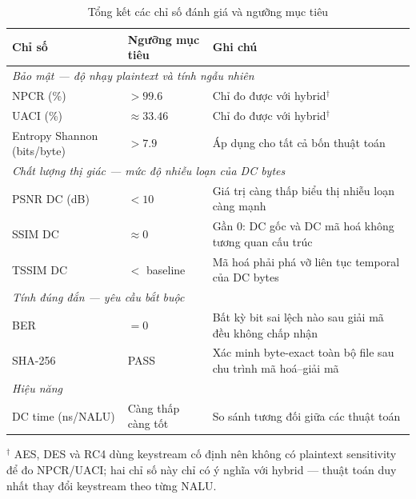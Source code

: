 \begin{table}[ht]
\centering
\caption{Tổng kết các chỉ số đánh giá và ngưỡng mục tiêu}
\label{tab:metrics_summary}
\begin{tabular}{|l|l|l|}
\hline
\textbf{Chỉ số} & \textbf{Ngưỡng mục tiêu} & \textbf{Ghi chú} \\
\hline
\multicolumn{3}{|l|}{\textit{Bảo mật --- độ nhạy plaintext và tính ngẫu nhiên}} \\
\hline
NPCR (\%) & $> 99.6$ & Chỉ đo được với hybrid$^\dagger$ \\
UACI (\%) & $\approx 33.46$ & Chỉ đo được với hybrid$^\dagger$ \\
Entropy Shannon (bits/byte) & $> 7.9$ & Áp dụng cho tất cả bốn thuật toán \\
\hline
\multicolumn{3}{|l|}{\textit{Chất lượng thị giác --- mức độ nhiễu loạn của DC bytes}} \\
\hline
PSNR DC (dB) & $< 10$ & Giá trị càng thấp biểu thị nhiễu loạn càng mạnh \\
SSIM DC & $\approx 0$ & Gần 0: DC gốc và DC mã hoá không tương quan cấu trúc \\
TSSIM DC & $<$ baseline & Mã hoá phải phá vỡ liên tục temporal của DC bytes \\
\hline
\multicolumn{3}{|l|}{\textit{Tính đúng đắn --- yêu cầu bắt buộc}} \\
\hline
BER & $= 0$ & Bất kỳ bit sai lệch nào sau giải mã đều không chấp nhận \\
SHA-256 & PASS & Xác minh byte-exact toàn bộ file sau chu trình mã hoá--giải mã \\
\hline
\multicolumn{3}{|l|}{\textit{Hiệu năng}} \\
\hline
DC time (ns/NALU) & Càng thấp càng tốt & So sánh tương đối giữa các thuật toán \\
\hline
\end{tabular}
\begin{tablenotes}
\small
\item $^\dagger$ AES, DES và RC4 dùng keystream cố định nên không có plaintext sensitivity để đo NPCR/UACI;
hai chỉ số này chỉ có ý nghĩa với hybrid --- thuật toán duy nhất thay đổi keystream theo từng NALU.
\end{tablenotes}
\end{table}
